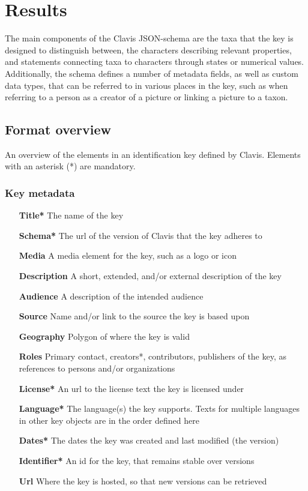 \documentclass[10pt,letterpaper]{article}
\begin{document}
\section*{
Results
}
The main components of the Clavis JSON-schema are the taxa that the key is designed to distinguish between, the characters describing relevant properties, and statements connecting taxa to characters through states or numerical values. Additionally, the schema defines a number of metadata fields, as well as custom data types, that can be referred to in various places in the key, such as when referring to a person as a creator of a picture or linking a picture to a taxon.

\subsection*{
Format overview
}
An overview of the elements in an identification key defined by Clavis. Elements with an asterisk (*) are mandatory.

\subsubsection*{
Key metadata
}
\begin{itemize}
\item[\textbf{Title*}]
The name of the key
\item[\textbf{Schema*}]
The url of the version of Clavis that the key adheres to
\item[\textbf{Media}]
A media element for the key, such as a logo or icon
\item[\textbf{Description}]
A short, extended, and/or external description of the key
\item[\textbf{Audience}]
A description of the intended audience
\item[\textbf{Source}]
Name and/or link to the source the key is based upon
\item[\textbf{Geography}]
Polygon of where the key is valid
\item[\textbf{Roles}]
Primary contact, creators*, contributors, publishers of the key, as references to persons and/or organizations
\item[\textbf{License*}]
An url to the license text the key is licensed under
\item[\textbf{Language*}]
The language(s) the key supports. Texts for multiple languages in other key objects are in the order defined here
\item[\textbf{Dates*}]
The dates the key was created and last modified (the version)
\item[\textbf{Identifier*}]
An id for the key, that remains stable over versions
\item[\textbf{Url}]
Where the key is hosted, so that new versions can be retrieved
\end{itemize}
\end{document}

